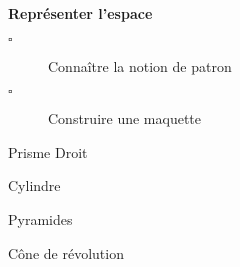 \begin{titre}

\end{titre}

 

\begin{CpsCol}
\textbf{Représenter l'espace}
\begin{description}
\item[$\square$] Connaître la notion de patron
\item[$\square$] Construire une maquette
\end{description}
\end{CpsCol}


\begin{DefT}{Prisme Droit}

\end{DefT}

\begin{Rq}

\end{Rq}

\begin{Ex}

\end{Ex}

\begin{Rq}

\end{Rq}

\begin{DefT}{Cylindre}

\end{DefT}

\begin{Ex}

\end{Ex}

\begin{DefT}{Pyramides}

\end{DefT}

\begin{Ex}

\end{Ex}






\begin{DefT}{Cône de révolution}

\end{DefT}

